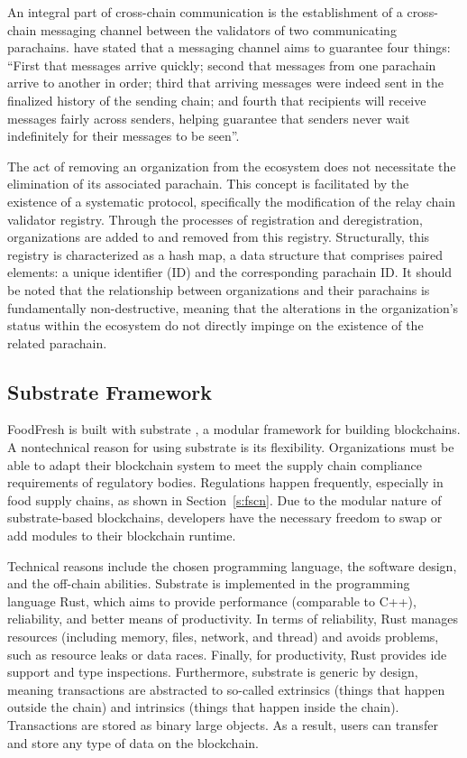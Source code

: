 \documentclass[conference,a4paper,flushend]{neutr}
\begin{document}
An integral part of cross-chain communication is the establishment of a cross-chain messaging channel between the validators of two communicating parachains. \citeauthor{burdges2020overview} \cite{burdges2020overview} have stated that a messaging channel aims to guarantee four things: ``First that messages arrive quickly; second that messages from one parachain arrive to another in order; third that arriving messages were indeed sent in the finalized history of the sending chain; and fourth that recipients will receive messages fairly across senders, helping guarantee that senders never wait indefinitely for their messages to be seen''.

The act of removing an organization from the ecosystem does not necessitate the elimination of its associated parachain. This concept is facilitated by the existence of a systematic protocol, specifically the modification of the relay chain validator registry. Through the processes of registration and deregistration, organizations are added to and removed from this registry. Structurally, this registry is characterized as a hash map, a data structure that comprises paired elements: a unique identifier (ID) and the corresponding parachain ID. It should be noted that the relationship between organizations and their parachains is fundamentally non-destructive, meaning that the alterations in the organization's status within the ecosystem do not directly impinge on the existence of the related parachain.

\subsection{Substrate Framework} \label{s:substrate_framework}
FoodFresh is built with substrate \cite{substrateio}, a modular framework for building blockchains. A nontechnical reason for using substrate is its flexibility. Organizations must be able to adapt their blockchain system to meet the supply chain compliance requirements of regulatory bodies. Regulations happen frequently, especially in food supply chains, as shown in Section~\ref{s:fscn}. Due to the modular nature of substrate-based blockchains, developers have the necessary freedom to swap or add modules to their blockchain runtime.

Technical reasons include the chosen programming language, the software design, and the off-chain abilities. Substrate is implemented in the programming language Rust, which aims to provide performance (comparable to C++), reliability, and better means of productivity. In terms of reliability, Rust manages resources (including memory, files, network, and thread) and avoids problems, such as resource leaks or data races. Finally, for productivity, Rust provides \ac{ide} support and type inspections. Furthermore, substrate is generic by design, meaning transactions are abstracted to so-called extrinsics (things that happen outside the chain) and intrinsics (things that happen inside the chain). Transactions are stored as binary large objects. As a result, users can transfer and store any type of data on the blockchain. 
\end{document}
